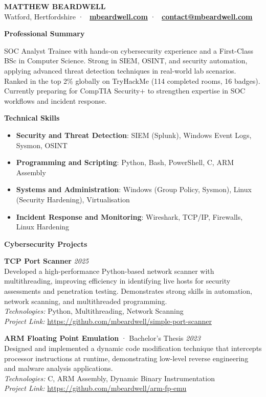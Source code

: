 \documentclass[10pt,a4paper]{article}
\newcommand{\setfontsize}[2]{\fontsize{#1}{#1}\selectfont{}#2}
\newcommand{\textcolorbf}[1]{\textbf{\textcolor{surface}{#1}}}
\newenvironment{cvsection}[1]{
  \begin{tcolorbox}[
    colback=accent!10,
    boxrule=0pt,
    colframe=white,
    left=4pt,
    right=4pt,
    top=2pt,
    bottom=2pt,
    sharp corners=all,
    coltext=surface
  ]
    \textcolorbf{#1}
  \end{tcolorbox}
  \vspace{0.2em}
}
{\vspace{0.2em}}
\newcommand{\entry}[3]{
  #1 \hfill \textit{#2} \\
  #3
  \vspace{0.2em}
}
\begin{document}
\begin{center}
  {\setfontsize{28pt}{\textcolorbf{MATTHEW BEARDWELL}}} \\
  [1.5em]
  Watford, Hertfordshire · \
  \textcolorbf{\href{https://mbeardwell.com}{mbeardwell.com}} · \
  \textcolorbf{\href{mailto:contact@mbeardwell.com}{contact@mbeardwell.com}} \\
  [1.5em]
\end{center}

\begin{cvsection}{Professional Summary}
SOC Analyst Trainee with hands-on cybersecurity experience and a First-Class BSc in Computer Science. 
Strong in SIEM, OSINT, and security automation, applying advanced threat detection techniques in real-world lab scenarios. 
Ranked in the top 2\% globally on TryHackMe (114 completed rooms, 16 badges). \\
Currently preparing for CompTIA Security+ to strengthen expertise in SOC workflows and incident response.
\end{cvsection}

\begin{cvsection}{Technical Skills}
\begin{itemize}[leftmargin=*]
  \item \textcolorbf{Security and Threat Detection}: SIEM (Splunk), Windows Event Logs, Sysmon, OSINT
  \item \textcolorbf{Programming and Scripting}: Python, Bash, PowerShell, C, ARM Assembly
  \item \textcolorbf{Systems and Administration}: Windows (Group Policy, Sysmon), Linux (Security Hardening), Virtualisation
  \item \textcolorbf{Incident Response and Monitoring}: Wireshark, TCP/IP, Firewalls, Linux Hardening
\end{itemize}
\end{cvsection}

\begin{cvsection}{Cybersecurity Projects}
\entry{\textcolorbf{TCP Port Scanner}}{2025}{
  Developed a high-performance Python-based network scanner with multithreading, 
  improving efficiency in identifying live hosts for security assessments and penetration testing. 
  Demonstrates strong skills in automation, network scanning, and multithreaded programming. \\ 
  \textit{Technologies:} Python, Multithreading, Network Scanning \\ 
  \textit{Project Link:} \url{https://github.com/mbeardwell/simple-port-scanner}
}

\entry{\textcolorbf{ARM Floating Point Emulation} · Bachelor's Thesis}{2023}{
  Designed and implemented a dynamic code modification technique that intercepts processor
  instructions at runtime, demonstrating low-level reverse engineering and malware analysis
  applications. \\ 
  \textit{Technologies:} C, ARM Assembly, Dynamic Binary Instrumentation \\ 
  \textit{Project Link:} \url{https://github.com/mbeardwell/arm-fp-emu}
}
\end{cvsection}
\end{document}
